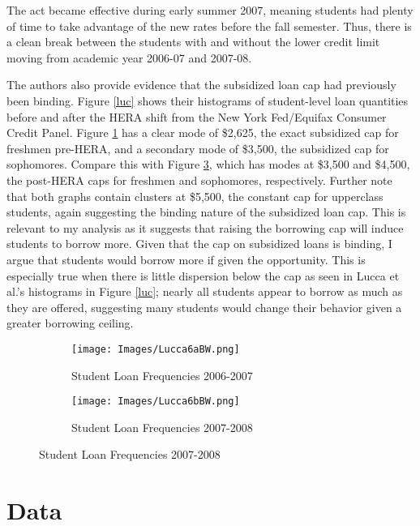 \documentclass[12pt]{article}
\begin{document}
	The act became effective during early summer 2007, meaning students had plenty of time to take advantage of the new rates before the fall semester. Thus, there is a clean break between the students with and without the lower credit limit moving from academic year 2006-07 and 2007-08.
	
	The authors also provide evidence that the subsidized loan cap had previously been binding. Figure \ref{luc} shows their histograms of student-level loan quantities before and after the HERA shift from the New York Fed/Equifax Consumer Credit Panel. Figure \ref{luc06} has a clear mode of \$2,625, the exact subsidized cap for freshmen pre-HERA, and a secondary mode of \$3,500, the subsidized cap for sophomores. Compare this with Figure \ref{luc07}, which has modes at \$3,500 and \$4,500, the post-HERA caps for freshmen and sophomores, respectively. Further note that both graphs contain clusters at \$5,500, the constant cap for upperclass students, again suggesting the binding nature of the subsidized loan cap. This is relevant to my analysis as it suggests that raising the borrowing cap will induce students to borrow more. Given that the cap on subsidized loans is binding, I argue that students would borrow more if given the opportunity. This is especially true when there is little dispersion below the cap as seen in Lucca et al.'s histograms in Figure \ref{luc}; nearly all students appear to borrow as much as they are offered, suggesting many students would change their behavior given a greater borrowing ceiling.
	
	\begin{figure}
	\centering
	\caption{Student Loan Frequencies From NY Fed CCP/Equifax Panel as Presented in \textcite{lucca2018}.}
	\label{luc}
	\begin{subfigure}{0.49\textwidth}
		\centering
		\caption{Student Loan Frequencies 2006-2007}
		\label{luc06}
		\texttt{[image: Images/Lucca6aBW.png]}
	\end{subfigure} 
	\begin{subfigure}{0.49\textwidth}
		\centering
		\caption{Student Loan Frequencies 2007-2008}
		\label{luc07}
		\texttt{[image: Images/Lucca6bBW.png]}
	\end{subfigure}
	\end{figure}

	
	
	\section{Data}
	
\end{document}

